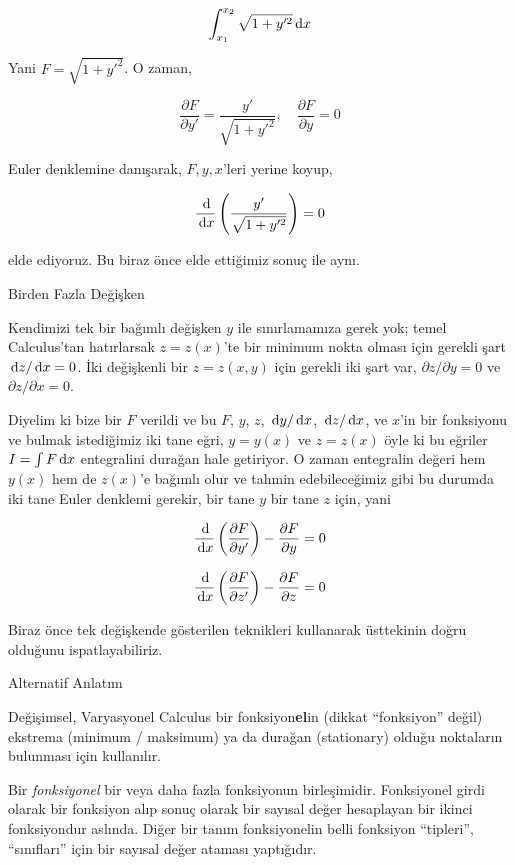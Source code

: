 \documentclass[12pt,fleqn]{article}\usepackage{../../common}
\begin{document}
$$
\int _{x_1}^{x_2} \sqrt{1 + y'^2} \,\mathrm{d} x
$$

Yani $F =  \sqrt{1 + {y'}^2}$. O zaman,

$$
\frac{\partial F}{\partial y'} = \frac{y'}{\sqrt{1 + y'^2}}, \quad
\frac{\partial F}{\partial y} = 0
$$

Euler denklemine danışarak, $F,y,x$'leri yerine koyup,

$$
\frac{\,\mathrm{d}}{\,\mathrm{d} x} \left(
 \frac{y'}{\sqrt{1 + y'^2}}
\right) = 0
$$

elde ediyoruz. Bu biraz önce elde ettiğimiz sonuç ile aynı. 

Birden Fazla Değişken

Kendimizi tek bir bağımlı değişken $y$ ile sınırlamamıza gerek yok; temel
Calculus'tan hatırlarsak $z = z(x)$'te bir minimum nokta olması için
gerekli şart $\,\mathrm{d} z / \,\mathrm{d} x = 0$. İki değişkenli bir $z = z(x,y)$ için
gerekli iki şart var, $\partial z / \partial y = 0$ ve $\partial z
/ \partial x = 0$. 

Diyelim ki bize bir $F$ verildi ve bu $F$, $y$, $z$, $\,\mathrm{d} y / \,\mathrm{d} x$, $\,\mathrm{d} z /
\,\mathrm{d} x$, ve $x$'in bir fonksiyonu ve bulmak istediğimiz iki tane eğri,
$y=y(x)$ ve $z=z(x)$ öyle ki bu eğriler $I = \int F \,\mathrm{d} x$ entegralini
durağan hale getiriyor. O zaman entegralin değeri hem $y(x)$ hem de
$z(x)$'e bağımlı olur ve tahmin edebileceğimiz gibi bu durumda iki tane
Euler denklemi gerekir, bir tane $y$ bir tane $z$ için, yani

$$
\frac{\,\mathrm{d}}{\,\mathrm{d} x} 
  \left( \frac{\partial F}{\partial y'} \right) -
  \frac{\partial F}{\partial y} = 0
$$

$$
\frac{\,\mathrm{d}}{\,\mathrm{d} x} 
  \left( \frac{\partial F}{\partial z'} \right) -
  \frac{\partial F}{\partial z} = 0
$$

Biraz önce tek değişkende gösterilen teknikleri kullanarak üsttekinin doğru
olduğunu ispatlayabiliriz.  



\newpage

Alternatif Anlatım

Değişimsel, Varyasyonel Calculus bir fonksiyon\textbf{el}in (dikkat
``fonksiyon'' değil) ekstrema (minimum / maksimum) ya da durağan
(stationary) olduğu noktaların bulunması için kullanılır.

Bir {\em fonksiyonel} bir veya daha fazla fonksiyonun
birleşimidir. Fonksiyonel girdi olarak bir fonksiyon alıp sonuç olarak
bir sayısal değer hesaplayan bir ikinci fonksiyondur aslında. Diğer
bir tanım fonksiyonelin belli fonksiyon ``tipleri'', ``sınıfları''
için bir sayısal değer ataması yaptığıdır.
\end{document}

